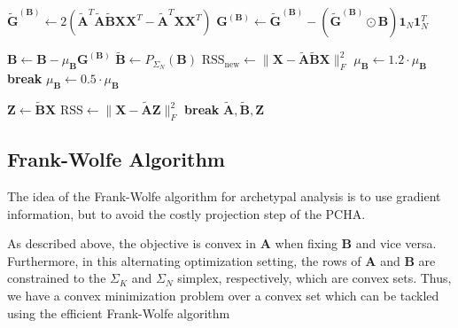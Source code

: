 \documentclass[oneside]{article}
\begin{document}
\begin{algorithm}
\begin{algorithmic}[1]
        \State $\tilde{\mathbf{G}}^{(\mathbf{B})} \gets 2 \left( \tilde{\mathbf{A}}^T \tilde{\mathbf{A}} \tilde{\mathbf{B}} \mathbf{X} \mathbf{X}^T - \tilde{\mathbf{A}}^T \mathbf{X} \mathbf{X}^T \right)$
        \State $\mathbf{G}^{(\mathbf{B})} \gets \tilde{\mathbf{G}}^{(\mathbf{B})} - \left( \tilde{\mathbf{G}}^{(\mathbf{B})} \odot \mathbf{B} \right) \mathbf{1}_N \mathbf{1}_N^T$
        
         
            \State $\mathbf{B} \gets \mathbf{B} - \mu_\mathbf{B} \mathbf{G}^{(\mathbf{B})}$
            \State $\tilde{\mathbf{B}} \gets P_{\Sigma_N}(\mathbf{B})$
            \State $\text{RSS}_{\text{new}} \gets \| \mathbf{X} - \tilde{\mathbf{A}} \tilde{\mathbf{B}} \mathbf{X} \|_F^2$
                \State $\mu_\mathbf{B} \gets 1.2 \cdot \mu_\mathbf{B}$
                \State \textbf{break}
            \Else
                \State $\mu_\mathbf{B} \gets 0.5 \cdot \mu_\mathbf{B}$
            \EndIf
        \EndFor
    \EndFor

    \State {}
    \State $\mathbf{Z} \gets \tilde{\mathbf{B}} \mathbf{X}$
    \State $\text{RSS} \gets \| \mathbf{X} - \tilde{\mathbf{A}} \mathbf{Z} \|_F^2$
        \State \textbf{break}
    \EndIf
\EndWhile
\State \Return $\tilde{\mathbf{A}}, \tilde{\mathbf{B}}, \mathbf{Z}$
\end{algorithmic}
\end{algorithm}

\subsection{Frank-Wolfe Algorithm}

The idea of the Frank-Wolfe algorithm for archetypal analysis is to use gradient information, but to avoid the costly projection step of the PCHA. 

As described above, the objective is convex in $\mathbf{A}$ when fixing $\mathbf{B}$ and vice versa. Furthermore, in this alternating optimization setting, the rows of $\mathbf{A}$ and $\mathbf{B}$ are constrained to the $\Sigma_K$ and $\Sigma_N$ simplex, respectively, which are convex sets. Thus, we have a convex minimization problem over a convex set which can be tackled using the efficient Frank-Wolfe algorithm \autocite{clarksonCoresetsSparseGreedy2010}
\end{document}
